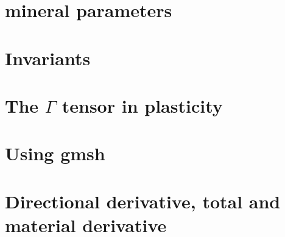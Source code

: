\documentclass[a4paper,12pt]{report}
\begin{document}
\chapter{mineral parameters}  %
\chapter{Invariants \label{app:invariants}}  %
\chapter{The $\Gamma$ tensor in plasticity}  %
\chapter{Using gmsh \label{app:gmsh}}  %
\chapter{Directional derivative, total and material derivative \label{app:ders}}  %

\printbibliography
\end{document}
